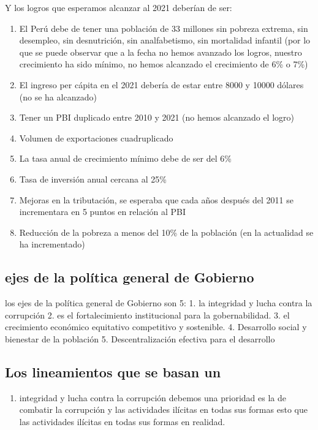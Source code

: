 \documentclass[
  a4paper,
]{article}
\providecommand{\tightlist}{%
  \setlength{\itemsep}{0pt}\setlength{\parskip}{0pt}}\usepackage{longtable,booktabs,array}
\begin{document}
Y los logros que esperamos alcanzar al 2021 deberían de ser:

\begin{enumerate}
\def\labelenumi{\arabic{enumi}.}
\tightlist
\item
  El Perú debe de tener una población de 33 millones sin pobreza
  extrema, sin desempleo, sin desnutrición, sin analfabetismo, sin
  mortalidad infantil (por lo que se puede observar que a la fecha no
  hemos avanzado los logros, nuestro crecimiento ha sido mínimo, no
  hemos alcanzado el crecimiento de 6\% o 7\%)
\item
  El ingreso per cápita en el 2021 debería de estar entre 8000 y 10000
  dólares (no se ha alcanzado)
\item
  Tener un PBI duplicado entre 2010 y 2021 (no hemos alcanzado el logro)
\item
  Volumen de exportaciones cuadruplicado
\item
  La tasa anual de crecimiento mínimo debe de ser del 6\%
\item
  Tasa de inversión anual cercana al 25\%
\item
  Mejoras en la tributación, se esperaba que cada años después del 2011
  se incrementara en 5 puntos en relación al PBI
\item
  Reducción de la pobreza a menos del 10\% de la población (en la
  actualidad se ha incrementado)
\end{enumerate}

\hypertarget{ejes-de-la-poluxedtica-general-de-gobierno}{%
\subsection{ejes de la política general de
Gobierno}\label{ejes-de-la-poluxedtica-general-de-gobierno}}

los ejes de la política general de Gobierno son 5: 1. la integridad y
lucha contra la corrupción 2. es el fortalecimiento institucional para
la gobernabilidad. 3. el crecimiento económico equitativo competitivo y
sostenible. 4. Desarrollo social y bienestar de la población 5.
Descentralización efectiva para el desarrollo

\hypertarget{los-lineamientos-que-se-basan-un}{%
\subsection{Los lineamientos que se basan
un}\label{los-lineamientos-que-se-basan-un}}

\begin{enumerate}
\def\labelenumi{\arabic{enumi}.}
\tightlist
\item
  integridad y lucha contra la corrupción debemos una prioridad es la de
  combatir la corrupción y las actividades ilícitas en todas sus formas
  esto que las actividades ilícitas en todas sus formas en realidad.
\end{enumerate}
\end{document}
